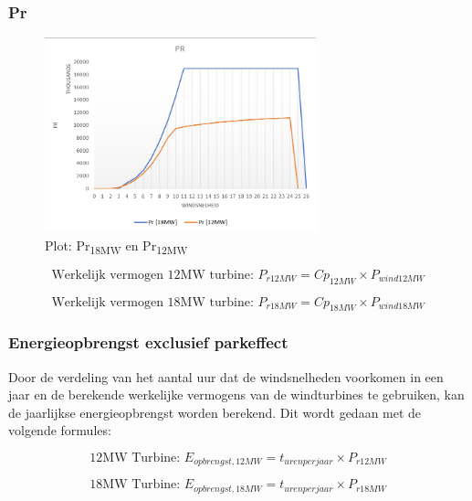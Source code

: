 \subsubsection{Pr}
\begin{figure}[H]
\centering
\includegraphics[width=0.7\textwidth]{IMG/data/overzicht/Pr_graph.PNG}
\caption{Plot: Pr\textsubscript{18MW} en Pr\textsubscript{12MW}}
\label{fig:PrGraph}
\end{figure}


\begin{equation} \label{eq:5}
\text{Werkelijk vermogen 12MW turbine: } P_{r12MW}=Cp_{12MW}\times P_{wind12MW}
\end{equation}

\begin{equation} \label{eq:6}
\text{Werkelijk vermogen 18MW turbine: } P_{r18MW}=Cp_{18MW}\times P_{wind18MW}
\end{equation}

\subsubsection{Energieopbrengst exclusief parkeffect}
Door de verdeling van het aantal uur dat de windsnelheden voorkomen in een jaar en de berekende werkelijke vermogens van de windturbines te gebruiken, kan de jaarlijkse energieopbrengst worden berekend. Dit wordt gedaan met de volgende formules: 

\begin{equation} \label{eq:8}
\text{12MW Turbine: } E_{opbrengst,12MW}=t_{uren per jaar}\times P_{r12MW}
\end{equation}

\begin{equation} \label{eq:9}
\text{18MW Turbine: } E_{opbrengst,18MW}=t_{uren per jaar}\times P_{r18MW}
\end{equation}

